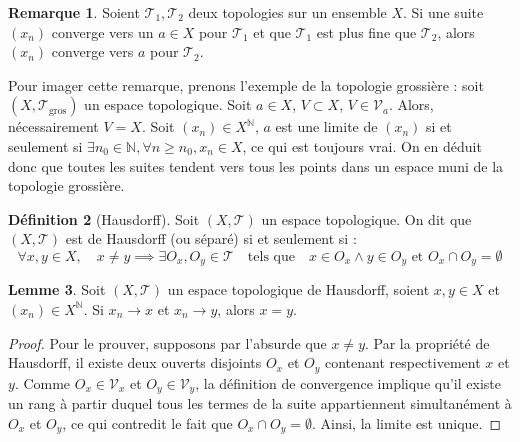 \documentclass[12pt, a4paper]{report}
\theoremstyle{definition}
\newtheorem{definition}{Définition}[chapter]
\newtheorem{lemme}[definition]{Lemme}
\newtheorem{remarque}[definition]{Remarque}
\begin{document}
\begin{remarque}
Soient $\mathcal{T}_1, \mathcal{T}_2$ deux topologies sur un ensemble $X$. Si une suite $(x_n)$ converge vers un $a \in X$ pour $\mathcal{T}_1$ et que $\mathcal{T}_1$ est plus fine que $\mathcal{T}_2$, alors $(x_n)$ converge vers $a$ pour $\mathcal{T}_2$.
\end{remarque}

Pour imager cette remarque, prenons l'exemple de la topologie grossière : soit $(X, \mathcal{T}_{\text{gros}})$ un espace topologique. Soit $a \in X$, $V \subset X$, $V \in \mathcal{V}_a$. Alors, nécessairement $V = X$. Soit $(x_n) \in X^{\mathbb{N}}$, $a$ est une limite de $(x_n)$ si et seulement si $\exists n_0 \in \mathbb{N}, \forall n \ge n_0, x_n \in X$, ce qui est toujours vrai. On en déduit donc que toutes les suites tendent vers tous les points dans un espace muni de la topologie grossière.

\begin{definition}[Hausdorff]
Soit $(X, \mathcal{T})$ un espace topologique. On dit que $(X, \mathcal{T})$ est de Hausdorff (ou séparé) si et seulement si :
\[ \forall x, y \in X, \quad x \neq y \implies \exists O_x, O_y \in \mathcal{T} \quad \text{tels que} \quad x \in O_x \land y \in O_y \text{ et } O_x \cap O_y = \emptyset \]
\end{definition}

\begin{lemme}
Soit $(X, \mathcal{T})$ un espace topologique de Hausdorff, soient $x, y \in X$ et $(x_n) \in X^{\mathbb{N}}$. Si $x_n \to x$ et $x_n \to y$, alors $x = y$.
\end{lemme}

\begin{proof}
Pour le prouver, supposons par l'absurde que $x \neq y$. Par la propriété de Hausdorff, il existe deux ouverts disjoints $O_x$ et $O_y$ contenant respectivement $x$ et $y$. Comme $O_x \in \mathcal{V}_x$ et $O_y \in \mathcal{V}_y$, la définition de convergence implique qu'il existe un rang à partir duquel tous les termes de la suite appartiennent simultanément à $O_x$ et $O_y$, ce qui contredit le fait que $O_x \cap O_y = \emptyset$. Ainsi, la limite est unique.
\end{proof}
\end{document}
